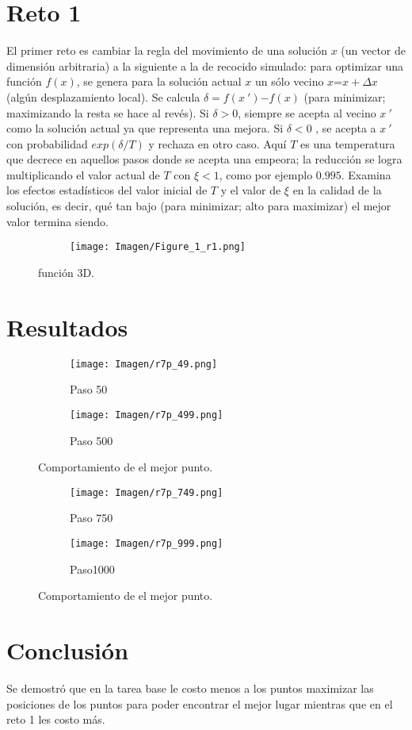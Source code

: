 \documentclass{article}
\begin{document}
\section{Reto 1}
El primer reto es cambiar la regla del movimiento de una solución $x$ (un vector de dimensión arbitraria) a la siguiente a la de recocido simulado: para optimizar una función $f(x)$, se genera para la solución actual $x$ un sólo vecino $x$=$x + \varDelta x$ (algún desplazamiento local). Se calcula $ \delta =f(x\:') $$-$$ f(x)$ (para minimizar; maximizando la resta se hace al revés). Si $ \delta >0$, siempre se acepta al vecino $x\:'$como la solución actual ya que representa una mejora. Si $\delta<0$
, se acepta a $x\:'$ con probabilidad  
$exp( \delta / T)$ y rechaza en otro caso. Aquí $T$ es una temperatura que decrece en aquellos pasos donde se acepta una empeora; la reducción se logra multiplicando el valor actual de $T$ con $\xi < 1$, como por ejemplo $ 0.995$. Examina los efectos estadísticos del valor inicial de $T$ y el valor de $\xi$ en la calidad de la solución, es decir, qué tan bajo (para minimizar; alto para maximizar) el mejor valor termina siendo.

\begin{figure}[H]
\centering
\begin{subfigure}[b]{1.0\linewidth}
\texttt{[image: Imagen/Figure\_1\_r1.png]}
\end{subfigure}
\caption{función 3D.}
\label{fig:westminster}
\end{figure}
\section{Resultados}
\begin{figure}[H]
\centering
\begin{subfigure}[b]{0.45\linewidth}
\texttt{[image: Imagen/r7p\_49.png]}
\caption{Paso 50}
\end{subfigure}
\begin{subfigure}[b]{0.45\linewidth}
\texttt{[image: Imagen/r7p\_499.png]}
\caption{Paso 500}
\end{subfigure}
\caption{Comportamiento de el mejor punto.}
\label{fig:westminster}
\end{figure}
  \begin{figure}[H]
\centering
\begin{subfigure}[b]{0.45\linewidth}
\texttt{[image: Imagen/r7p\_749.png]}
\caption{Paso 750}
\end{subfigure}
\begin{subfigure}[b]{0.45\linewidth}
\texttt{[image: Imagen/r7p\_999.png]}
\caption{Paso1000}
\end{subfigure}
\caption{Comportamiento de el mejor punto.}
\label{fig:westminster}
\end{figure}
\newpage
 \section{Conclusión}

Se demostró que en la tarea base le costo menos a los puntos maximizar las posiciones de los puntos para poder encontrar el mejor lugar mientras que en el reto 1 les costo más.

 
 

 
\end{document}

